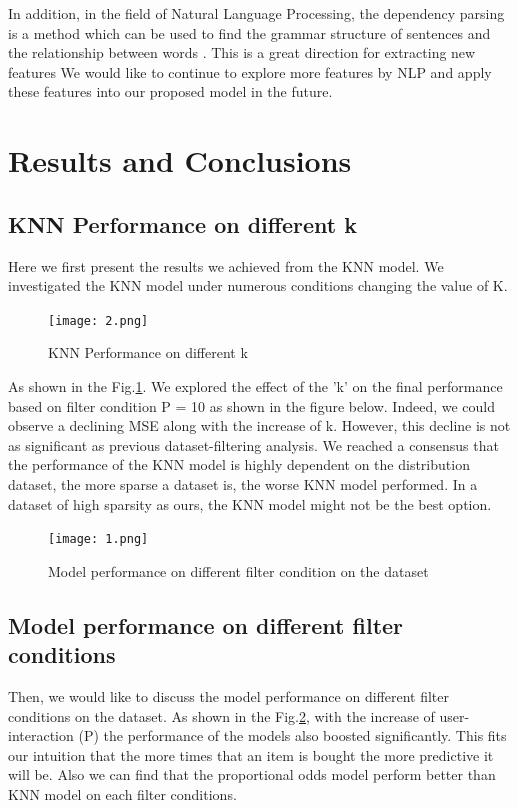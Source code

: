 \documentclass[sigconf]{acmart}
\begin{document}
In addition, in the field of Natural Language Processing, the dependency parsing is a method which can be used to find the grammar structure of sentences and the relationship between words \cite{cambria2014jumping}. This is a great direction for extracting new features We would like to continue to explore more features by NLP and apply these features into our proposed model in the future.

\section{Results and Conclusions}
\subsection{KNN Performance on different k}
Here we first present the results we achieved from the KNN model. We investigated the KNN model under numerous conditions changing the value of K.

\begin{figure}[h]
  \centering
  \texttt{[image: 2.png]}
  \caption{KNN Performance on different k}
  \label{6}
\end{figure}

As shown in the Fig.\ref{6}. We explored the effect of the 'k' on the final performance based on filter condition P = 10 as shown in the figure below. Indeed, we could observe a declining MSE along with the increase of k. However, this decline is not as significant as previous dataset-filtering analysis.  We reached a consensus that the performance of the KNN model is highly dependent on the distribution dataset, the more sparse a dataset is, the worse KNN model performed. In a dataset of high sparsity as ours, the KNN model might not be the best option.

\begin{figure}[h]
  \centering
  \texttt{[image: 1.png]}
  \caption{Model performance on different filter condition on the dataset}
  \label{5}
\end{figure}

\subsection{Model performance on different filter conditions}
Then, we would like to discuss the model performance on different filter conditions on the dataset. As shown in the Fig.\ref{5}, with the increase of user-interaction (P) the performance of the models also boosted significantly. This fits our intuition that the more times that an item is bought the more predictive it will be. Also we can find that the proportional odds model perform better than KNN model on each filter conditions. 
\end{document}
